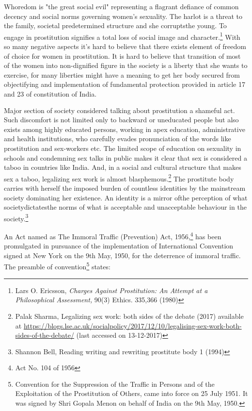 \begin{multicols}{2}
\noi
Whoredom is "the great social evil" representing a flagrant defiance of common decency and
social norms governing women’s sexuality. The harlot is a threat to the family, societal predetermined structure and she corruptsthe young. To engage in prostitution signifies a total loss
of social image and character.\footnote{Lars O. Ericsson, \textit{Charges Against Prostitution: An Attempt at a Philosophical Assessment,} 90(3) Ethics. 335,366 (1980)} With so many negative aspects it’s hard to believe that there exists element of freedom of choice for women in prostitution. It is hard to believe that transition of most of the women into non-dignified figure in the society is a liberty that she
wants to exercise, for many liberties might have a meaning to get her body secured from
objectifying and implementation of fundamental protection provided in article 17 and 23 of
constitution of India.


\noi
Major section of society considered talking about prostitution a shameful act. Such discomfort
is not limited only to backward or uneducated people but also exists among highly educated
persons, working in apex education, administrative and health institutions, who carefully
evades pronunciation of the words like prostitution and sex-workers etc. The limited scope of
education on sexuality in schools and condemning sex talks in public makes it clear that sex is
considered a taboo in countries like India. And, in a social and cultural structure that makes sex
a taboo, legalizing sex work is almost blasphemous.\footnote{Palak Sharma, Legalizing sex work: both sides of the debate (2017) available at \url{https://blogs.lse.ac.uk/socialpolicy/2017/12/10/legalising-sex-work-both-sides-of-the-debate/} (last accessed on 13-12-2017)} The prostitute body carries with herself
the imposed burden of countless identities by the mainstream society dominating her existence.
An identity is a mirror ofthe perception of what societydictatesthe norms of what is acceptable
and unacceptable behaviour in the society.\footnote{Shannon Bell, Reading writing and rewriting prostitute body 1 (1994)}

\noi
An Act named as The Immoral Traffic (Prevention) Act, 1956,\footnote{Act No. 104 of 1956} has been promulgated in
pursuance of the implementation of International Convention signed at New York on the 9th
May, 1950, for the deterrence of immoral traffic. The preamble of convention\footnote{Convention for the Suppression of the Traffic in Persons and of the Exploitation of the Prostitution of Others,
came into force on 25 July 1951. It was signed by Shri Gopala Menon on behalf of India on the 9th May, 1950.} states:


\end{multicols}
